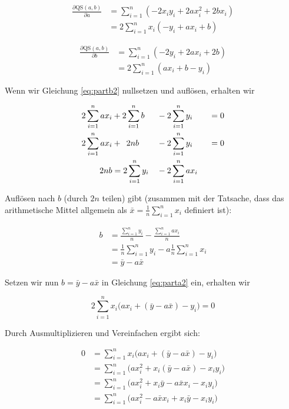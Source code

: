 \documentclass[ngerman, 12pt]{scrartcl}
\def\qs{\text{QS}(a,b)}
\def\sm{\sum\limits_{i=1}^{n}}
\begin{document}
\begin{align}
\frac{\partial \qs}{\partial a}	&= \sm (-2x_iy_i + 2ax_i^2 + 2bx_i) \label{eq:parta1}\\
								&= 2 \sm x_i(-y_i + ax_i + b) \label{eq:parta2} 
\end{align}

\begin{align}
\frac{\partial \qs}{\partial b}	&= \sm (-2y_i+2ax_i +2b) \label{eq:partb1}\\
								&= 2 \sm (ax_i + b -y_i) \label{eq:partb2}
\end{align}

Wenn wir Gleichung \ref{eq:partb2} nullsetzen und auflösen, erhalten wir 

\begin{alignat}{3}
2\sm ax_i &+ 2\sm b &&- 2 \sm y_i \quad &&= 0 \\
2\sm ax_i &+ \enskip 2nb &&- 2 \sm y_i \quad &&= 0 \\ 
2nb &= 2 \sm y_i &&- 2\sm ax_i && 
\end{alignat}

Auflösen nach $b$ (durch $2n$ teilen) gibt (zusammen mit der Tatsache, dass das arithmetische Mittel allgemein als $\bar{x}= \frac{1}{n} \sm x_i$ definiert ist):

\begin{align}
b &= \frac{\sm y_i}{n} - \frac{\sm ax_i}{n} \\
	&= \frac{1}{n} \sm y_i - a \frac{1}{n} \sm x_i \\
	&= \bar{y} - a \bar{x}
\end{align}

Setzen wir nun $b=\bar{y} - a \bar{x}$ in Gleichung \ref{eq:parta2} ein, erhalten wir

\begin{equation}
	2\sm x_i \big(ax_i + (\bar{y} - a \bar{x}) - y_i\big)=0
	\label{eq:einsetz}
\end{equation}

\clearpage Durch Ausmultiplizieren und Vereinfachen ergibt sich:

\begin{align}
0 &= 	\sm x_i \big(ax_i + (\bar{y} - a \bar{x}) - y_i\big) \\
	&= \sm \big(ax_i^2+x_i(\bar{y}-a\bar{x})-x_iy_i \big) \\
     &= \sm \big(ax_i^2 + x_i\bar{y} - a\bar{x}x_i- x_iy_i \big) \\
     &= \sm \big(ax_i^2 - a\bar{x}x_i + x_i\bar{y} - x_iy_i \big) 
\end{align}
\end{document}
